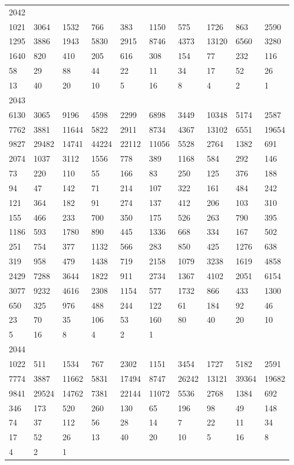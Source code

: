 \begin{longtable}{*{10}{l}}
2042&&&&&&&&&\\
1021& 3064& 1532& 766& 383& 1150& 575& 1726& 863& 2590\\
1295& 3886& 1943& 5830& 2915& 8746& 4373& 13120& 6560& 3280\\
1640& 820& 410& 205& 616& 308& 154& 77& 232& 116\\
58& 29& 88& 44& 22& 11& 34& 17& 52& 26\\
13& 40& 20& 10& 5& 16& 8& 4& 2& 1\\

2043&&&&&&&&&\\
6130& 3065& 9196& 4598& 2299& 6898& 3449& 10348& 5174& 2587\\
7762& 3881& 11644& 5822& 2911& 8734& 4367& 13102& 6551& 19654\\
9827& 29482& 14741& 44224& 22112& 11056& 5528& 2764& 1382& 691\\
2074& 1037& 3112& 1556& 778& 389& 1168& 584& 292& 146\\
73& 220& 110& 55& 166& 83& 250& 125& 376& 188\\
94& 47& 142& 71& 214& 107& 322& 161& 484& 242\\
121& 364& 182& 91& 274& 137& 412& 206& 103& 310\\
155& 466& 233& 700& 350& 175& 526& 263& 790& 395\\
1186& 593& 1780& 890& 445& 1336& 668& 334& 167& 502\\
251& 754& 377& 1132& 566& 283& 850& 425& 1276& 638\\
319& 958& 479& 1438& 719& 2158& 1079& 3238& 1619& 4858\\
2429& 7288& 3644& 1822& 911& 2734& 1367& 4102& 2051& 6154\\
3077& 9232& 4616& 2308& 1154& 577& 1732& 866& 433& 1300\\
650& 325& 976& 488& 244& 122& 61& 184& 92& 46\\
23& 70& 35& 106& 53& 160& 80& 40& 20& 10\\
5& 16& 8& 4& 2& 1& \\

2044&&&&&&&&&\\
1022& 511& 1534& 767& 2302& 1151& 3454& 1727& 5182& 2591\\
7774& 3887& 11662& 5831& 17494& 8747& 26242& 13121& 39364& 19682\\
9841& 29524& 14762& 7381& 22144& 11072& 5536& 2768& 1384& 692\\
346& 173& 520& 260& 130& 65& 196& 98& 49& 148\\
74& 37& 112& 56& 28& 14& 7& 22& 11& 34\\
17& 52& 26& 13& 40& 20& 10& 5& 16& 8\\
4& 2& 1& \\


\end{longtable}

